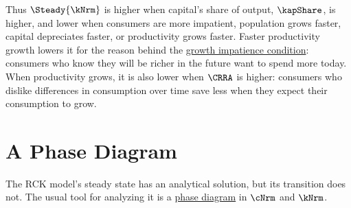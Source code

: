 \documentclass{econark}
\begin{document}
Thus $\Steady{\kNrm}$ is higher when capital's share of output, $\kapShare$, is higher, and lower when consumers are more impatient, population grows faster, capital depreciates faster, or productivity grows faster. Faster productivity growth lowers it for the reason behind the \href{https://intertemporal-choice.github.io/content/consumption/perfforesightcrra/\#eq-patwgrocond}{growth impatience condition}: consumers who know they will be richer in the future want to spend more today. When productivity grows, it is also lower when $\CRRA$ is higher: consumers who dislike differences in consumption over time save less when they expect their consumption to grow.

\section{A Phase Diagram}

The RCK model's steady state has an analytical solution, but its transition
does not. The usual tool for analyzing it is a \href{https://en.wikipedia.org/wiki/Phase_portrait}{phase diagram} in $\cNrm$ and $\kNrm$.
\end{document}
